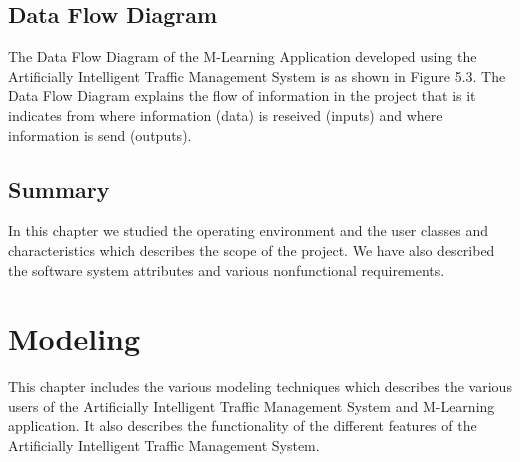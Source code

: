 \documentclass[openany,12pt]{report}
\begin{document}
\section{Data Flow Diagram}
\hspace*{0.5in} The Data Flow Diagram of the M-Learning Application developed using the Artificially Intelligent Traffic Management System is as shown in Figure 5.3. The Data Flow Diagram explains the flow of information in the project that is it indicates from where information (data) is reseived (inputs) and where information is send (outputs).\\
\newpage

\section{Summary}
\hspace*{0.5in} In this chapter we studied the operating environment and the user classes and characteristics which describes the scope of the project. We have also described the software system attributes and various nonfunctional requirements.

\chapter{Modeling}

\hspace*{0.5in} This chapter includes the various modeling techniques which describes the various users of the Artificially Intelligent Traffic Management System and M-Learning application. It also describes the functionality of the different features of the Artificially Intelligent Traffic Management System.
\end{document}
